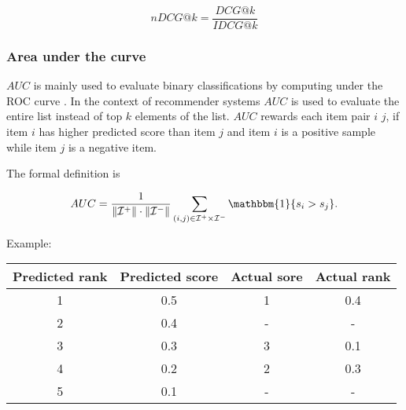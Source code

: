 $$nDCG@k=\frac{DCG@k}{IDCG@k}$$

\subsubsection{Area under the curve}
$AUC$ is mainly used to evaluate binary classifications by computing  under
the ROC curve \cite{prati2008evaluating}. In the context of recommender systems $AUC$ is used to evaluate the
entire list instead of top $k$ elements of the list. $AUC$ rewards each item pair $i$ $j$, if
item $i$ has higher predicted score than item $j$ and item $i$ is a positive sample while item
$j$ is a negative item.

The formal definition is

\[ AUC=\frac{1}{\|\mathcal{I}^{+}\|\cdot\|\mathcal{I}^-\|}
\sum_{(i,j)\in\mathcal{I}^+\times\mathcal{I}^-}\mathbbm{1} \{s_i > s_j \}.\]

Example:


\begin{tabular}{ |c | c | c| c|}
  \hline			
  Predicted rank & Predicted score & Actual sore & Actual rank\\
  \hline
  \hline
  1 & 0.5 & 1 & 0.4\\
  2 & 0.4 & - & - \\
  3 & 0.3 & 3 & 0.1 \\
  4 & 0.2 & 2 & 0.3\\
  5 & 0.1 & - &-\\
  \hline  

\end{tabular}

